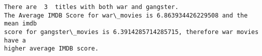 \documentclass[11pt]{article}
\begin{document}
    \begin{Verbatim}[commandchars=\\\{\}]
There are  3  titles with both war and gangster.
The Average IMDB Score for war\_movies is 6.863934426229508 and the mean imdb
score for gangster\_movies is 6.3914285714285715, therefore war movies have a
higher average IMDB score.
    \end{Verbatim}

    \begin{center}
    \end{center}
    { \hspace*{\fill} \\}
    

    
    
    
\end{document}
